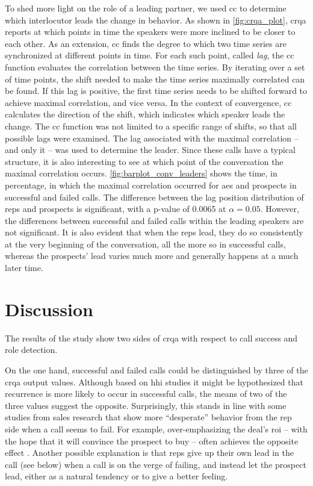 To shed more light on the role of a leading partner, we used \acl{cc} to determine which interlocutor leads the change in behavior.
As shown in \cref{fig:crqa_plot}, \ac{crqa} reports at which points in time the speakers were more inclined to be closer to each other.
As an extension, \acl{cc} finds the degree to which two time series are synchronized at different points in time.
For each such point, called \emph{lag}, the \acl{cc} function evaluates the correlation between the time series.
By iterating over a set of time points, the shift needed to make the time series maximally correlated can be found.
If this lag is positive, the first time series needs to be shifted forward to achieve maximal correlation, and vice versa.
In the context of convergence, \ac{cc} calculates the direction of the shift, which indicates which speaker leads the change.
The \acl{cc} function was not limited to a specific range of shifts, so that all possible lags were examined.
The lag associated with the maximal correlation -- and only it -- was used to determine the leader.
Since these calls have a typical structure, it is also interesting to see at which point of the conversation the maximal correlation occurs.
\cref{fig:barplot_conv_leaders} shows the time, in percentage, in which the maximal correlation occurred for \acp{ae} and prospects in successful and failed calls.
The difference between the lag position distribution of reps and prospects is significant, with a p-value of \num{0.0065} at $\alpha = 0.05$.
However, the differences between successful and failed calls within the leading speakers are not significant.
It is also evident that when the reps lead, they do so consistently at the very beginning of the conversation, all the more so in successful calls, whereas the prospects' lead varies much more and generally happens at a much later time.

\section{Discussion}
\label{discussion}

The results of the study show two sides of \ac{crqa} with respect to call success and role detection.

On the one hand, successful and failed calls could be distinguished by three of the \ac{crqa} output values.
Although based on \ac{hhi} studies it might be hypothesized that recurrence is more likely to occur in successful calls, the means of two of the three values suggest the opposite.
Surprisingly, this stands in line with some studies from sales research that show more \enquote{desperate} behavior from the rep side when a call seems to fail.
For example, over-emphasizing the deal's \ac{roi} -- with the hope that it will convince the prospect to buy -- often achieves the opposite effect \citep{Orlob2018roi}.
Another possible explanation is that reps give up their own lead in the call (see below) when a call is on the verge of failing, and instead let the prospect lead, either as a natural tendency or to give a better feeling.

